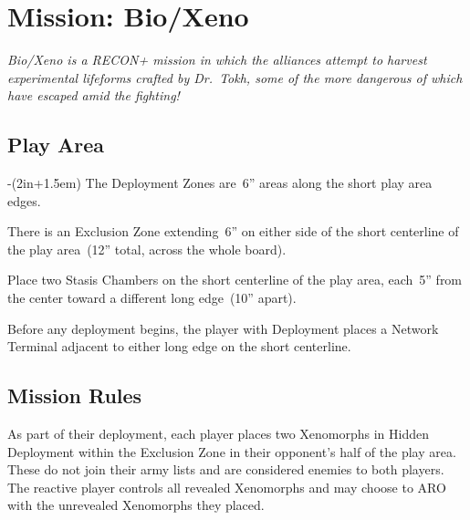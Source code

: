 \chapter{Mission: Bio/Xeno}

\emph{\emph{Bio/Xeno} is a RECON+ mission in which the alliances
  attempt to harvest experimental lifeforms crafted by Dr.~Tokh, some
  of the more dangerous of which have escaped amid the fighting!}

\section{Play Area}
\vspace{-2\parskip}
\noindent\begin{stdminipage}{\linewidth-(2in+1.5em)}
\vspace{0pt}   
\noindent
The Deployment Zones are~6'' areas along the short play area edges.

There is an Exclusion Zone extending~6'' on either side of the short
centerline of the play area~(12'' total, across the whole board).


Place two Stasis Chambers on the short centerline of the play area,
each~5'' from the center toward a different long edge~(10'' apart).

Before any deployment begins, the player with Deployment places a
Network Terminal adjacent to either long edge on the short centerline.

\vspace*{-8pt}
\section{Mission Rules}

\vspace*{-4pt}
As part of their deployment, each player places two Xenomorphs in
Hidden Deployment within the Exclusion Zone in their opponent's half
of the play area.  These do not join their army lists and are
considered enemies to both players.  The reactive player
controls all revealed Xenomorphs and may choose to ARO with the
unrevealed Xenomorphs they placed.

\noindent\begin{minipage}{\linewidth}\center
\setlength\fboxrule{2pt}  
\end{minipage}
\end{stdminipage}
